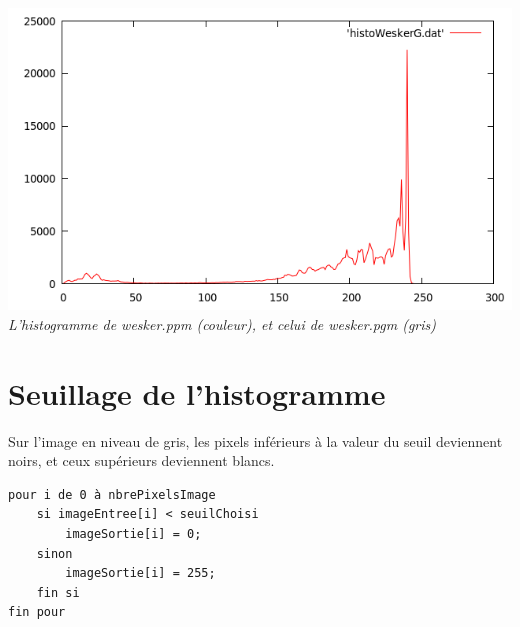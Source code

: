\documentclass[a4paper,11pt]{article}
\begin{document}
\begin{center}
\includegraphics[scale=0.55]{histoWeskerG.png}\\
\textit{L'histogramme de wesker.ppm (couleur), et celui de wesker.pgm (gris)}
\end{center}

\newpage
\section{Seuillage de l'histogramme}
Sur l'image en niveau de gris, les pixels inférieurs à la valeur du seuil deviennent noirs, et ceux supérieurs deviennent blancs.

\begin{verbatim}
pour i de 0 à nbrePixelsImage
    si imageEntree[i] < seuilChoisi
        imageSortie[i] = 0;
    sinon
        imageSortie[i] = 255;
    fin si
fin pour
\end{verbatim}
\end{document}
